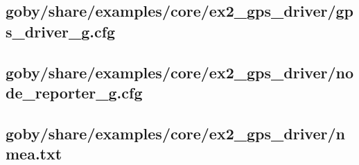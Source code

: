 \subsection{goby/share/examples/core/ex2\_gps\_driver/gps\_driver\_g.cfg} \label{sec:gps_driver:gps_driver_g.cfg}
\resetbvlinenumber

\subsection{goby/share/examples/core/ex2\_gps\_driver/node\_reporter\_g.cfg} \label{sec:gps_driver:node_reporter_g.cfg}
\resetbvlinenumber

\subsection{goby/share/examples/core/ex2\_gps\_driver/nmea.txt} \label{sec:gps_driver:nmea.txt}
\resetbvlinenumber

\DeleteShortVerb{\!}
